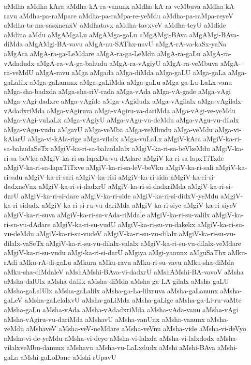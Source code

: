 {aMdha
aMdha-kAra
aMdha-kA-ra-vanunx
aMdha-kA-ra-veMbuva
aMdha-kA-ravu
aMdha-pa-raMpare
aMdha-pa-raMpa-re-yeMdu
aMdha-pa-raMpa-reyeV
aMdha-ta-ma-sasxnenxV
aMdhatavx
aMdha-tavxveV
aMdha-teyU
aMdide
aMdina
aMdu
aMgAMgaLu
aMgAMga-gaLu
aMgAMgi-BAva
aMgAMgi-BAva-diMda
aMgAMgi-BA-vavu
aMgA-nu-SAThx-navU
aMgA-rA-va-kaSx-yaNa
aMgAra
aMgA-ra-ga-LeMdare
aMgA-ra-ga-LeMdu
aMgA-ra-gaLu
aMgA-ra-vAdadudx
aMgA-ra-vA-ga-bahudu
aMgA-ra-vAgiyU
aMgA-ra-veMbuva
aMgA-ra-veMdU
aMgA-ravu
aMga
aMgada
aMga-diMda
aMga-gaLU
aMga-gaLa
aMga-gaLalilx
aMga-gaLanunx
aMga-gaLiMda
aMga-gaLu
aMga-ga-Lu-LaLx-vanu
aMga-sha-badxda
aMga-sha-riV-rada
aMga-vAda
aMga-vA-gade
aMga-vAgi
aMga-vAgi-dadxre
aMga-vAgide
aMga-vAgidudx
aMga-vAgilalx
aMga-vAgilalx-vAdadxriMda
aMga-vAgiruva
aMga-vAgiru-va-dariMda
aMga-vAgi-ve-yeMdu
aMga-vAgi-vuLaLx
aMga-vAgiyU
aMga-vAgu-vu-deMdu
aMga-vAgu-vu-dilalx
aMga-vAgu-vudu
aMgavU
aMga-veMba
aMga-veMbudu
aMga-veMdu
aMga-vi-kAlarU
aMga-vi-kAla-rige
aMga-vilalx
aMga-vuLaLx
aMgiV-kAra
aMgiV-ka-ri-sa-bahudaSeTx
aMgiV-ka-ri-sa-bahudalalx
aMgiV-ka-ri-sa-beVkeMdu
aMgiV-ka-ri-sa-beVku
aMgiV-ka-ri-sa-lapxDu-vu-dAdare
aMgiV-ka-ri-sa-lapxTiTxde
aMgiV-ka-ri-sa-lapxTiTxve
aMgiV-ka-ri-sa-leV-beVku
aMgiV-ka-ri-sali
aMgiV-ka-ri-salu
aMgiV-ka-ri-sari
aMgiV-ka-risi
aMgiV-ka-ri-sida
aMgiV-ka-ri-si-dadxneVnx
aMgiV-ka-ri-si-dadxrU
aMgiV-ka-ri-si-dadxriMda
aMgiV-ka-ri-si-darU
aMgiV-ka-ri-si-dare
aMgiV-ka-ri-side
aMgiV-ka-ri-si-didxV-yeMdu
aMgiV-ka-ri-sidudx
aMgiV-ka-ri-si-ru-vu-dariMda
aMgiV-ka-ri-siye
aMgiV-ka-ri-siyeV
aMgiV-ka-ri-suva
aMgiV-ka-ri-su-vAda-riMdale
aMgiV-ka-ri-su-valilx
aMgiV-ka-ri-su-vu-dAdare
aMgiV-ka-ri-su-vudU
aMgiV-ka-ri-su-vu-dakekx
aMgiV-ka-ri-su-vu-deMdu
aMgiV-ka-ri-su-vudeV
aMgiV-ka-ri-su-vu-dilalx
aMgiV-ka-ri-su-vu-dilalx-vaSeTx
aMgiV-ka-ri-su-vu-dilalx-valalx
aMgiV-ka-ri-su-vu-dilalx-veMdare
aMgiV-ka-ri-su-vudu
aMgi-ka-ri-si-darU
aMgiya
aMgi-yanunx
aMguSaThx
aMku-rAdi
aMku-rA-di-gaLu
aMkura
aMku-ravu
aMku-ri-su-vavu
aMku-sha-diMda
aMku-sha-diMdaleV
aMshAMshi-BAva-vi-dadxrU
aMshAMshi-BA-vavoV
aMsha
aMsha-dalUlx
aMsha-dalilx
aMsha-diMda
aMsha-ga-LA-gilalx
aMsha-gaLU
aMsha-gaLalUlx
aMsha-gaLalilx
aMsha-ga-La-lilxruva
aMsha-gaLanunx
aMsha-gaLeV
aMsha-gaLelalxvU
aMsha-gaLiMda
aMsha-gaLige
aMsha-ga-Li-ru-vaMte
aMsha-gaLu
aMsha-vAda
aMsha-vAdadxriMda
aMsha-vAda-vanu
aMsha-vAgi
aMsha-vAgiru-vu-dariMda
aMshavU
aMsha-vanUnx
aMsha-vanunx
aMsha-veMdu
aMshaveV
aMsha-veV-neMdare
aMsha-veVnu
aMsha-vide
aMsha-vi-deVyo
aMsha-vi-de-yeMdu
aMsha-vi-deyo
aMsha-vi-lalxda
aMsha-vi-lalxdodx
aMsha-vilalxveMbu-danunx
aMshavu
aMsha-vu-LaLxdudx
aMshi
aMshi-BAva
aMshi-gaLa
aMshi-gaLoDane
aMshi-rUpavU
}
